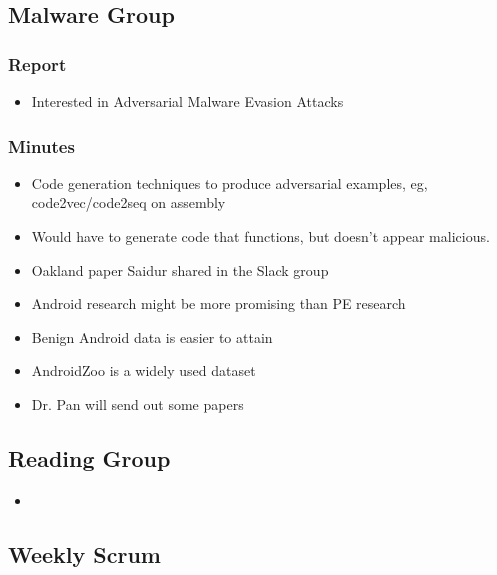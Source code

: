 \documentclass{article}
\begin{document}
\subsection*{Malware Group}
\subsubsection*{Report}
\begin{itemize}
	\item Interested in Adversarial Malware Evasion Attacks
\end{itemize}
\subsubsection*{Minutes}
\begin{itemize}
	\item Code generation techniques to produce adversarial examples, eg, code2vec/code2seq on assembly
	\item Would have to generate code that functions, but doesn't appear malicious.
	\item Oakland paper Saidur shared in the Slack group
	\item Android research might be more promising than PE research
	\item Benign Android data is easier to attain
	\item AndroidZoo is a widely used dataset
	\item Dr. Pan will send out some papers
\end{itemize}

\subsection*{Reading Group}
\begin{itemize}
	\item 
\end{itemize}

\subsection*{Weekly Scrum}
\end{document}
